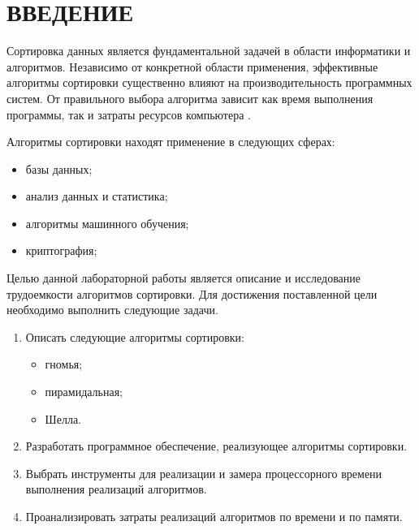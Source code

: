 \chapter*{ВВЕДЕНИЕ}

Сортировка данных является фундаментальной задачей в области информатики и алгоритмов. 
Независимо от конкретной области применения, эффективные алгоритмы сортировки существенно влияют на производительность программных систем. 
От правильного выбора алгоритма зависит как время выполнения программы, так и затраты ресурсов компьютера \cite{knut}.

Алгоритмы сортировки находят применение в следующих сферах:
\begin{itemize}
	\item базы данных;
	\item анализ данных и статистика;
	\item алгоритмы машинного обучения;
	\item криптография;
\end{itemize}

Целью данной лабораторной работы является описание и исследование трудоемкости алгоритмов сортировки.
Для достижения поставленной цели необходимо выполнить следующие задачи.

\begin{enumerate}
	\item Описать следующие алгоритмы сортировки: 
	\begin{itemize}
		\item гномья;
		\item пирамидальная;
		\item Шелла.
	\end{itemize}
	\item Разработать программное обеспечение, реализующее алгоритмы сортировки.
	\item Выбрать инструменты для реализации и замера процессорного времени
	выполнения реализаций алгоритмов.
	\item Проанализировать затраты реализаций алгоритмов по времени и по памяти.
\end{enumerate}
